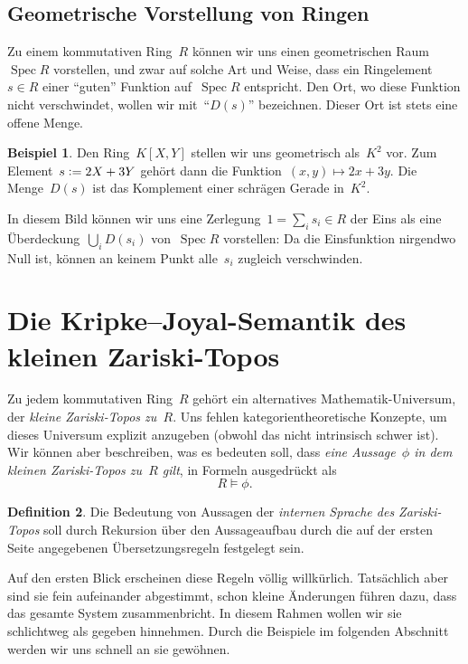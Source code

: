 \documentclass[a4paper,ngerman,12pt]{scrartcl}
\theoremstyle{definition}
\newtheorem{defn}{Definition}[section]
\newtheorem{bsp}[defn]{Beispiel}
\theoremstyle{plain}
\theoremstyle{remark}
\DeclareMathOperator{\Spec}{Spec}
\renewcommand{\_}{\mathpunct{.}\,}
\newcommand{\?}{\,{:}\,}
\newcommand{\defeq}{\vcentcolon=}
\begin{document}
\subsection{Geometrische Vorstellung von Ringen}

Zu einem kommutativen Ring~$R$ können wir uns einen geometrischen Raum~$\Spec
R$ vorstellen, und zwar auf solche Art und Weise, dass ein
Ringelement~$s \in R$ einer "`guten"' Funktion auf~$\Spec R$ entspricht.
Den Ort, wo diese Funktion nicht verschwindet, wollen wir mit~"`$D(s)$"'
bezeichnen. Dieser Ort ist stets eine offene Menge.

\begin{bsp}Den Ring~$K[X,Y]$ stellen wir uns geometrisch als~$K^2$ vor. Zum
Element~$s \defeq 2X+3Y$ gehört dann die Funktion~$(x,y) \mapsto 2x+3y$. Die
Menge~$D(s)$ ist das Komplement einer schrägen Gerade in~$K^2$.\end{bsp}

In diesem Bild können wir uns eine Zerlegung~$1 = \sum_i s_i \in R$ der Eins
als eine Über\-de\-ckung~$\bigcup_i D(s_i)$ von~$\Spec R$ vorstellen: Da die
Einsfunktion nirgendwo Null ist, können an keinem Punkt alle~$s_i$ zugleich
verschwinden.


\section{Die Kripke--Joyal-Semantik des kleinen Zariski-Topos}

Zu jedem kommutativen Ring~$R$ gehört ein alternatives Mathematik-Universum,
der \emph{kleine Zariski-Topos zu~$R$}. Uns fehlen kategorientheoretische
Konzepte, um dieses Universum explizit anzugeben (obwohl das nicht intrinsisch
schwer ist). Wir können aber beschreiben, was es bedeuten soll, dass \emph{eine
Aussage~$\phi$ in dem kleinen Zariski-Topos zu~$R$ gilt}, in Formeln
ausgedrückt als
\[ R \models \phi. \]

\begin{defn}Die Bedeutung von Aussagen der \emph{internen Sprache des
Zariski-Topos} soll durch Rekursion über den Aussageaufbau durch die auf der
ersten Seite angegebenen Übersetzungsregeln festgelegt sein.\end{defn}

Auf den ersten Blick erscheinen diese Regeln völlig
willkürlich. Tatsächlich aber sind sie fein aufeinander abgestimmt, schon
kleine Änderungen führen dazu, dass das gesamte System zusammenbricht. In
diesem Rahmen wollen wir sie schlichtweg als gegeben hinnehmen. Durch die
Beispiele im folgenden Abschnitt werden wir uns schnell an sie gewöhnen.
\end{document}
